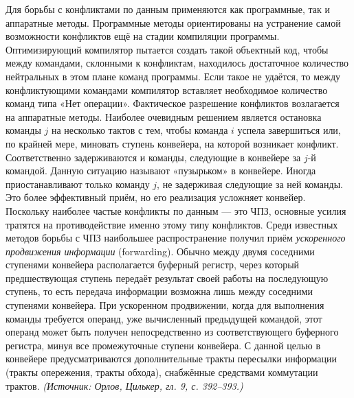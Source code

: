 \documentclass[a4paper,12pt]{article}
\begin{document}
Для борьбы с конфликтами по данным применяются как программные, так и аппаратные методы. Программные методы ориентированы на устранение самой возможности конфликтов ещё на стадии компиляции программы. Оптимизирующий компилятор пытается создать такой объектный код, чтобы между командами, склонными к конфликтам, находилось достаточное количество нейтральных в этом плане команд программы. Если такое не удаётся, то между конфликтующими командами компилятор вставляет необходимое количество команд типа «Нет операции». Фактическое разрешение конфликтов возлагается на аппаратные методы. Наиболее очевидным решением является остановка команды \(j\) на несколько тактов с тем, чтобы команда \(i\) успела завершиться или, по крайней мере, миновать ступень конвейера, на которой возникает конфликт. Соответственно задерживаются и команды, следующие в конвейере за \(j\)-й командой. Данную ситуацию называют «пузырьком» в конвейере. Иногда приостанавливают только команду \(j\), не задерживая следующие за ней команды. Это более эффективный приём, но его реализация усложняет конвейер. Поскольку наиболее частые конфликты по данным --- это ЧПЗ, основные усилия тратятся на противодействие именно этому типу конфликтов. Среди известных методов борьбы с ЧПЗ наибольшее распространение получил приём \emph{ускоренного продвижения информации} (forwarding). Обычно между двумя соседними ступенями конвейера располагается буферный регистр, через который предшествующая ступень передаёт результат своей работы на последующую ступень, то есть передача информации возможна лишь между соседними ступенями конвейера. При ускоренном продвижении, когда для выполнения команды требуется операнд, уже вычисленный предыдущей командой, этот операнд может быть получен непосредственно из соответствующего буферного регистра, минуя все промежуточные ступени конвейера. С данной целью в конвейере предусматриваются дополнительные тракты пересылки информации (тракты опережения, тракты обхода), снабжённые средствами коммутации трактов.
\textit{(Источник: Орлов, Цилькер, гл. 9, с. 392--393.)}
\end{document}

